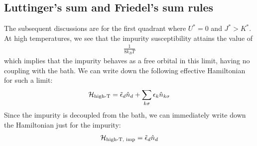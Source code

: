\documentclass[12pt,twoside]{article}
\numberwithin{equation}{section}
\begin{document}
\subsection{Luttinger's sum and Friedel's sum rules}
The subsequent discussions are for the first quadrant where \(U^* = 0\) and \(J^* > K^*\). At high temperatures, we see that the impurity susceptibility attains the value of
\begin{equation}\begin{aligned}
	\frac{1}{8k_B T}
\end{aligned}\end{equation}
which implies that the impurity behaves as a free orbital in this limit, having no coupling with the bath. We can write down the following effective Hamiltonian for such a limit:
\begin{equation}\begin{aligned}
	\mathcal{H}_\text{high-T} = \tilde \epsilon_d \hat n_d + \sum_{k\sigma} \epsilon_k\hat n_{k\sigma}
\end{aligned}\end{equation}
Since the impurity is decoupled from the bath, we can immediately write down the Hamiltonian just for the impurity:
\begin{equation}\begin{aligned}
	\mathcal{H}_\text{high-T, imp} = \tilde \epsilon_d \hat n_d
\end{aligned}\end{equation}
\end{document}
